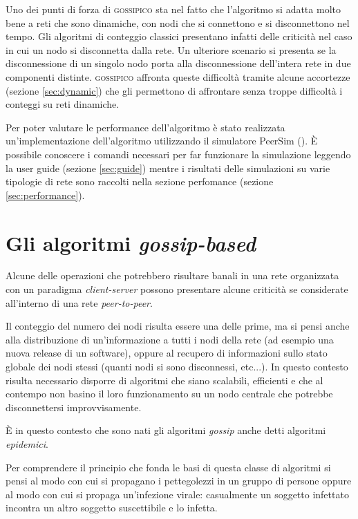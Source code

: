 \documentclass[a4paper,12pt]{article}
\begin{document}
Uno dei punti di forza di \textsc{gossipico} sta nel fatto che l'algoritmo si adatta molto bene a reti che sono dinamiche, con nodi che si connettono e si disconnettono nel tempo. Gli algoritmi di conteggio classici presentano infatti delle criticit\`a nel caso in cui un nodo si disconnetta dalla rete. Un ulteriore scenario si presenta se la disconnessione di un singolo nodo porta alla disconnessione dell'intera rete in due componenti distinte. \textsc{gossipico} affronta queste difficolt\`a tramite alcune accortezze (sezione \ref{sec:dynamic}) che gli permettono di affrontare senza troppe difficolt\`a i conteggi su reti dinamiche.

Per poter valutare le performance dell'algoritmo \`e stato realizzata un'implementazione dell'algoritmo utilizzando il simulatore PeerSim (\cite{rif2}). \`E possibile conoscere i comandi necessari per far funzionare la simulazione leggendo la user guide (sezione \ref{sec:guide}) mentre i risultati delle simulazioni su varie tipologie di rete sono raccolti nella sezione perfomance (sezione \ref{sec:performance}).

\section{Gli algoritmi \emph{gossip-based}}
\label{sec:gossip}

Alcune delle operazioni che potrebbero risultare banali in una rete organizzata con un paradigma \emph{client-server} possono presentare alcune criticit\`a se considerate all'interno di una rete \emph{peer-to-peer}.

Il conteggio del numero dei nodi risulta essere una delle prime, ma si pensi anche alla distribuzione di un'informazione a tutti i nodi della rete (ad esempio una nuova release di un software), oppure al recupero di informazioni sullo stato globale dei nodi stessi (quanti nodi si sono disconnessi, etc...). In questo contesto risulta necessario disporre di algoritmi che siano scalabili, efficienti e che al contempo non basino il loro funzionamento su un nodo centrale che potrebbe disconnettersi improvvisamente.

\`E in questo contesto che sono nati gli algoritmi \emph{gossip} anche detti algoritmi \emph{epidemici}. 

Per comprendere il principio che fonda le basi di questa classe di algoritmi si pensi al modo con cui si propagano i pettegolezzi in un gruppo di persone oppure al modo con cui si propaga un'infezione virale: casualmente un soggetto infettato incontra un altro soggetto suscettibile e lo infetta.
\end{document}
